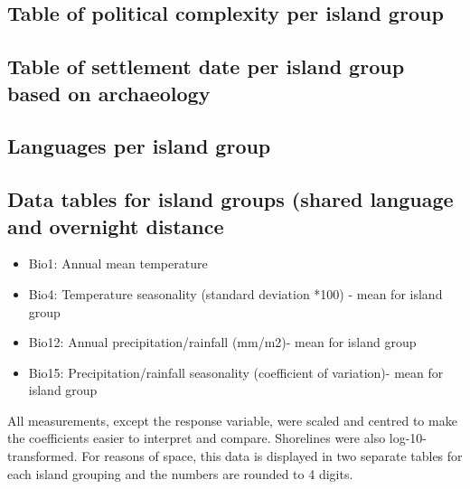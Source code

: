 \documentclass[12pt,letterpaper]{article}
\begin{document}
\FloatBarrier
\newpage
\subsection{Table of political complexity per island group }
\singlespacing
\label{appendix_pol_complex}



\newpage
\subsection{Table of settlement date per island group based on archaeology}
\singlespacing
\label{dates_table_appendic}





\subsection{Languages per island group}
\label{Subregions}
\singlespacing

\subsection{Data tables for island groups (shared language and overnight distance}
\singlespacing


\begin{itemize}
\item Bio1: Annual mean temperature
\item Bio4: Temperature seasonality (standard deviation *100) - mean for island group
\item Bio12: Annual precipitation/rainfall (mm/m2)- mean for island group
\item Bio15: Precipitation/rainfall seasonality (coefficient of variation)- mean for island group
\end{itemize}

All measurements, except the response variable, were scaled and centred to make the coefficients easier to interpret and compare. Shorelines were also log-10-transformed. For reasons of space, this data is displayed in two separate tables for each island grouping and the numbers are rounded to 4 digits.
\end{document}
